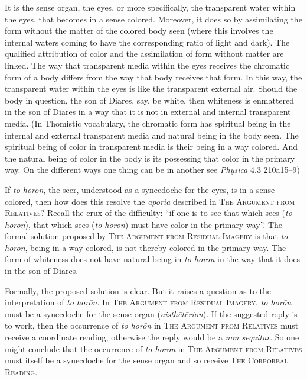 It is the sense organ, the eyes, or more specifically, the transparent water within the eyes, that becomes in a sense colored. Moreover, it does so by assimilating the form without the matter of the colored body seen (where this involves the internal waters coming to have the corresponding ratio of light and dark). The qualified attribution of color and the assimilation of form without matter are linked. The way that transparent media within the eyes receives the chromatic form of a body differs from the way that body receives that form. In this way, the transparent water within the eyes is like the transparent external air. Should the body in question, the son of Diares, say, be white, then whiteness is enmattered in the son of Diares in a way that it is not in external and internal transparent media. (In Thomistic vocabulary, the chromatic form has spiritual being in the internal and external transparent media and natural being in the body seen. The spiritual being of color in transparent media is their being in a way colored. And the natural being of color in the body is its possessing that color in the primary way. On the different ways one thing can be in another see \emph{Physica} 4.3 210a15–9) 

If \emph{to horōn}, the seer, understood as a synecdoche for the eyes, is in a sense colored, then how does this resolve the \emph{aporia} described in \textsc{The Argument from Relatives}? Recall the crux of the difficulty: ``if one is to see that which sees (\emph{to horōn}), that which sees (\emph{to horōn}) must have color in the primary way''. The formal solution proposed by \textsc{The Argument from Residual Imagery} is that \emph{to horōn}, being in a way colored, is not thereby colored in the primary way. The form of whiteness does not have natural being in \emph{to horōn} in the way that it does in the son of Diares.

Formally, the proposed solution is clear. But it raises a question as to the interpretation of \emph{to horōn}. In \textsc{The Argument from Residual Imagery}, \emph{to horōn} must be a synecdoche for the sense organ (\emph{aisthētērion}). If the suggested reply is to work, then the occurrence of \emph{to horōn} in \textsc{The Argument from Relatives} must receive a coordinate reading, otherwise the reply would be a \emph{non sequitur}. So one might conclude that the occurrence of \emph{to horōn} in \textsc{The Argument from Relatives} must itself be a synecdoche for the sense organ and so receive \textsc{The Corporeal Reading}. 

